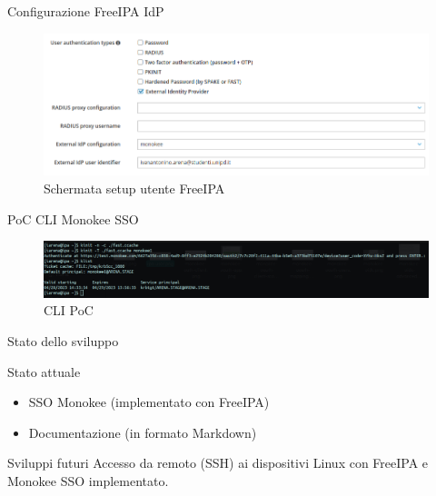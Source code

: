 \documentclass{beamer}
\begin{document}
	\begin{frame}{Configurazione FreeIPA IdP}
		
		\begin{figure}[H] 
			\centering 
			\includegraphics[width=\columnwidth]{immagini/appendici/ipa-user.png} 
			\caption{Schermata setup utente FreeIPA}
			\label{fig:ipa-setup-user}
		\end{figure}
		
		
	\end{frame}
	
	\begin{frame}{PoC CLI Monokee SSO}
		\begin{figure}[H] 
			\centering 
			\includegraphics[width=\columnwidth]{immagini/ipa-cli.png} 
			\caption{CLI PoC}
			\label{fig:cli-sso}
		\end{figure}
		
		
	\end{frame}
	\begin{frame}{Stato dello sviluppo}
				
		\begin{exampleblock}{Stato attuale}
			\begin{itemize}
				\item SSO Monokee (implementato con FreeIPA) \vspace{.5em}
				\item Documentazione (in formato Markdown) \vspace{.5em}
			\end{itemize}
		\end{exampleblock}
		
		\begin{block}{Sviluppi futuri}
			Accesso da remoto (SSH) ai dispositivi Linux con FreeIPA e Monokee SSO implementato.
		\end{block}
	
	\end{frame}
	
\end{document}
